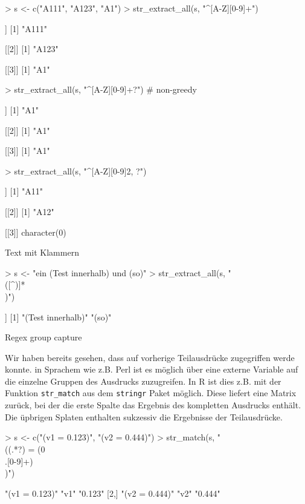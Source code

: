 \documentclass[a4paper]{report}
\newcommand{\R}{{\sffamily R}}
\begin{document}
\begin{Schunk}
\begin{Sinput}
> s <- c("A111", "A123", "A1")
> str_extract_all(s, "^[A-Z][0-9]+")
\end{Sinput}
\begin{Soutput}
[[1]]
[1] "A111"

[[2]]
[1] "A123"

[[3]]
[1] "A1"
\end{Soutput}
\begin{Sinput}
> str_extract_all(s, "^[A-Z][0-9]+?")     # non-greedy
\end{Sinput}
\begin{Soutput}
[[1]]
[1] "A1"

[[2]]
[1] "A1"

[[3]]
[1] "A1"
\end{Soutput}
\begin{Sinput}
> str_extract_all(s, "^[A-Z][0-9]{2, }?") 
\end{Sinput}
\begin{Soutput}
[[1]]
[1] "A11"

[[2]]
[1] "A12"

[[3]]
character(0)
\end{Soutput}
\end{Schunk}

Text mit Klammern

\begin{Schunk}
\begin{Sinput}
> s <- "ein (Test innerhalb) und (so)"
> str_extract_all(s, "\\([^)]*\\)") 
\end{Sinput}
\begin{Soutput}
[[1]]
[1] "(Test innerhalb)" "(so)"            
\end{Soutput}
\end{Schunk}


Regex group capture   

Wir haben bereits gesehen, dass auf vorherige Teilausdrücke zugegriffen werde konnte. in Sprachem wie z.B. Perl ist es möglich über eine externe Variable auf die einzelne Gruppen des Ausdrucks zuzugreifen. In \R{} ist dies z.B. mit der Funktion \verb!str_match! aus dem \texttt{stringr} Paket möglich. Diese liefert eine Matrix zurück, bei der die erste Spalte das Ergebnis des kompletten Ausdrucks enthält. Die üpbrigen Splaten enthalten sukzessiv die Ergebnisse der Teilausdrücke.

\begin{Schunk}
\begin{Sinput}
> s <- c("(v1 = 0.123)", "(v2 = 0.444)")
> str_match(s, "\\((.*?) = (0\\.[0-9]+)\\)")
\end{Sinput}
\begin{Soutput}
     [,1]           [,2] [,3]   
[1,] "(v1 = 0.123)" "v1" "0.123"
[2,] "(v2 = 0.444)" "v2" "0.444"
\end{Soutput}
\end{Schunk}
\end{document}
